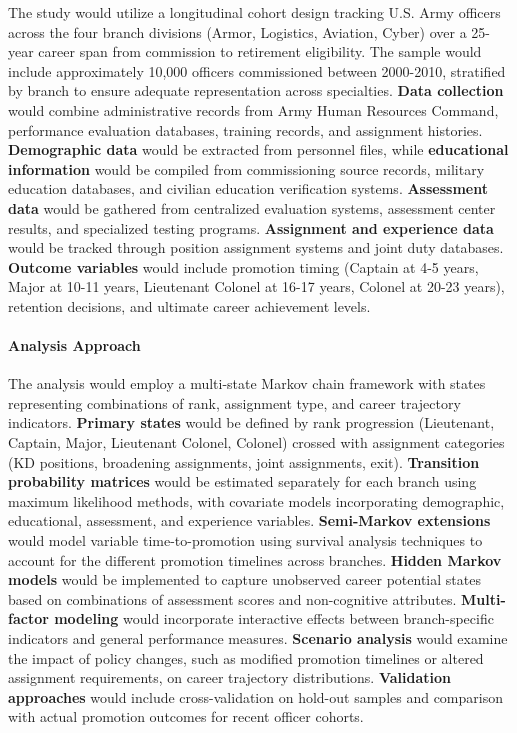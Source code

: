 \documentclass[main.tex]{subfiles}
\begin{document}
The study would utilize a longitudinal cohort design tracking U.S. Army officers across the four branch divisions (Armor, Logistics, Aviation, Cyber) over a 25-year career span from commission to retirement eligibility. The sample would include approximately 10,000 officers commissioned between 2000-2010, stratified by branch to ensure adequate representation across specialties. \textbf{Data collection} would combine administrative records from Army Human Resources Command, performance evaluation databases, training records, and assignment histories. \textbf{Demographic data} would be extracted from personnel files, while \textbf{educational information} would be compiled from commissioning source records, military education databases, and civilian education verification systems. \textbf{Assessment data} would be gathered from centralized evaluation systems, assessment center results, and specialized testing programs. \textbf{Assignment and experience data} would be tracked through position assignment systems and joint duty databases. \textbf{Outcome variables} would include promotion timing (Captain at 4-5 years, Major at 10-11 years, Lieutenant Colonel at 16-17 years, Colonel at 20-23 years), retention decisions, and ultimate career achievement levels\parencite{army_indicators}.

\paragraph{Analysis Approach}

The analysis would employ a multi-state Markov chain framework with states representing combinations of rank, assignment type, and career trajectory indicators. \textbf{Primary states} would be defined by rank progression (Lieutenant, Captain, Major, Lieutenant Colonel, Colonel) crossed with assignment categories (KD positions, broadening assignments, joint assignments, exit). \textbf{Transition probability matrices} would be estimated separately for each branch using maximum likelihood methods, with covariate models incorporating demographic, educational, assessment, and experience variables. \textbf{Semi-Markov extensions} would model variable time-to-promotion using survival analysis techniques to account for the different promotion timelines across branches\parencite{army_indicators}. \textbf{Hidden Markov models} would be implemented to capture unobserved career potential states based on combinations of assessment scores and non-cognitive attributes. \textbf{Multi-factor modeling} would incorporate interactive effects between branch-specific indicators and general performance measures. \textbf{Scenario analysis} would examine the impact of policy changes, such as modified promotion timelines or altered assignment requirements, on career trajectory distributions. \textbf{Validation approaches} would include cross-validation on hold-out samples and comparison with actual promotion outcomes for recent officer cohorts.
\end{document}
